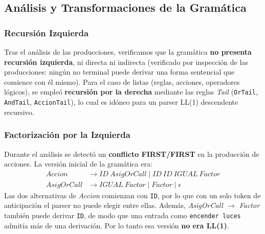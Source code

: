 \documentclass[12pt,a4paper]{article}
\begin{document}
\subsection{Análisis y Transformaciones de la Gramática}

\subsubsection{Recursión Izquierda}
Tras el análisis de las producciones, verificamos que la gramática \textbf{no presenta recursión izquierda}, ni directa ni indirecta (verificado por inspección de las producciones: ningún no terminal puede derivar una forma sentencial que comience con él mismo). Para el caso de listas (reglas, acciones, operadores lógicos), se empleó \textbf{recursión por la derecha} mediante las reglas \textit{Tail} (\texttt{OrTail}, \texttt{AndTail}, \texttt{AccionTail}), lo cual es idóneo para un parser LL(1) descendente recursivo.

\subsubsection{Factorización por la Izquierda}
Durante el análisis se detectó un \textbf{conflicto FIRST/FIRST} en la producción de acciones. La versión inicial de la gramática era:
\begin{align*}
\mathit{Accion} &\to \mathit{ID}\ \mathit{AsigOrCall} \mid \mathit{ID}\ \mathit{ID}\ \mathit{IGUAL}\ \mathit{Factor}\\
\mathit{AsigOrCall} &\to \mathit{IGUAL}\ \mathit{Factor} \mid \mathit{Factor} \mid \epsilon
\end{align*}
Las dos alternativas de \textit{Accion} comienzan con \texttt{ID}, por lo que con un solo token de anticipación el parser no puede elegir entre ellas. Además, \textit{AsigOrCall $\to$ Factor} también puede derivar \texttt{ID}, de modo que una entrada como \texttt{encender luces} admitía más de una derivación. Por lo tanto esa versión \textbf{no era LL(1)}.
\end{document}
